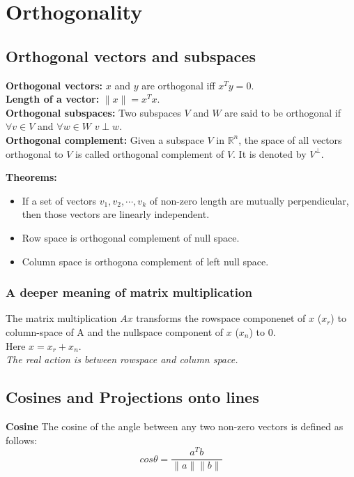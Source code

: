 \section{Orthogonality}
\subsection{Orthogonal vectors and subspaces}
\textbf{Orthogonal vectors:} $x$ and $y$ are orthogonal iff $x^Ty = 0$.\\
\textbf{Length of a vector:} $\|x\| = x^Tx$.\\
\textbf{Orthogonal subspaces:} Two subspaces $V$ and $W$ are said to be 
orthogonal if $\forall v \in V$ and $\forall w \in W$ $v \perp w$.\\
\textbf{Orthogonal complement:} Given a subspace $V$ in $\mathbb{R}^n$, the 
space of all vectors orthogonal to $V$ is called orthogonal complement of $V$.
It is denoted by $V^{\perp}$.


\begin{mdframed}[backgroundcolor=SlateGray2!40,linecolor=Firebrick4]
\textbf{Theorems:}
\begin{itemize}
\item If a set of vectors $v_1, v_2, \cdots, v_k$ of non-zero length are 
        mutually perpendicular, then those vectors are linearly independent.
\item Row space is orthogonal complement of null space.
\item Column space is orthogona complement of left null space. 
\end{itemize}
\end{mdframed}


\subsubsection{A deeper meaning of matrix multiplication}
The matrix multiplication $Ax$ transforms the rowspace componenet of $x$ ($x_r$) to column-space of A and the nullspace component of $x$ ($x_n$) to $0$.\\
Here $x = x_r + x_n$.\\
\textit{The real action is between rowspace and column space.}



\subsection{Cosines and Projections onto lines}

\textbf{Cosine} The cosine of the angle between any two non-zero vectors is defined as follows:
$$cos\theta = \frac{a^Tb}{\|a\|\|b\|}$$

